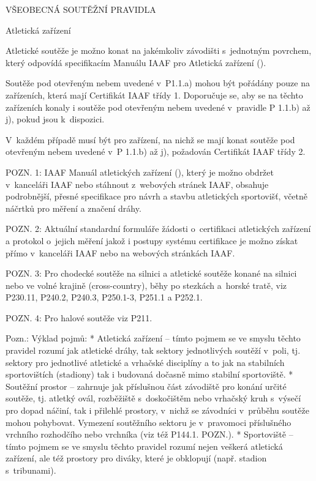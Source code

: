 \sec VŠEOBECNÁ SOUTĚŽNÍ PRAVIDLA

\secc Atletická zařízení

Atletické soutěže je možno konat na jakémkoliv závodišti s~jednotným povrchem, který odpovídá specifikacím Manuálu IAAF pro Atletická zařízení ().

Soutěže pod otevřeným nebem uvedené v~P1.1.a) mohou být pořádány pouze na zařízeních, která mají Certifikát IAAF třídy 1.
Doporučuje se, aby se na těchto zařízeních konaly i soutěže pod otevřeným nebem uvedené v~pravidle P 1.1.b) až j), pokud jsou k~dispozici.

V~každém případě musí být pro zařízení, na nichž se mají konat soutěže pod otevřeným nebem uvedené v~P 1.1.b) až j), požadován Certifikát IAAF třídy 2.

POZN. 1: IAAF Manuál atletických zařízení (), který je možno obdržet v~kanceláři IAAF nebo stáhnout z~webových stránek IAAF, obsahuje podrobnější, přesné specifikace pro návrh a stavbu atletických sportovišť, včetně náčrtků pro měření a značení dráhy.

POZN. 2: Aktuální standardní formuláře žádosti o~certifikaci atletických zařízení a protokol o~jejich měření jakož i postupy systému certifikace je možno získat přímo v~kanceláři IAAF nebo na webových stránkách IAAF.

POZN. 3: Pro chodecké soutěže na silnici a atletické soutěže konané na silnici nebo ve volné krajině (cross-country), běhy po stezkách a~horské tratě, viz P230.11, P240.2, P240.3, P250.1-3, P251.1 a P252.1.

POZN. 4: Pro halové soutěže viz P211.

Pozn.: Výklad pojmů:
\begitems
* Atletická zařízení -- tímto pojmem se ve smyslu těchto pravidel rozumí jak atletické dráhy, tak sektory jednotlivých soutěží v~poli, tj. sektory pro jednotlivé atletické a vrhačské disciplíny a to jak na stabilních sportovištích (stadiony) tak i budovaná dočasně mimo stabilní sportoviště.
* Soutěžní prostor -- zahrnuje jak příslušnou část závodiště pro konání určité soutěže, tj. atletký ovál, rozběžiště s~doskočištěm nebo vrhačský kruh s~výsečí pro dopad náčiní, tak i přilehlé prostory, v~nichž se závodníci v~průběhu soutěže mohou pohybovat. Vymezení soutěžního sektoru je v~pravomoci příslušného vrchního rozhodčího nebo vrchníka (viz též P144.1. POZN.).
* Sportoviště -- tímto pojmem se ve smyslu těchto pravidel rozumí nejen veškerá atletická zařízení, ale též prostory pro diváky, které je obklopují (např. stadion s~tribunami).
\enditems

